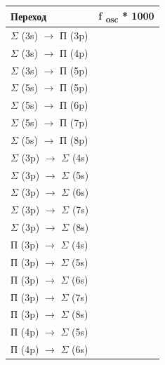 \begin{flushleft}
\tablefirsthead{}
\tablehead{}
\tabletail{}
\tablelasttail{}
\begin{supertabular}{|m{6.577cm}|m{6.801cm}|}
\hline
\textbf{{Переход}} &
\textbf{{f }}\textbf{{\textsubscript{osc }}}\textbf{{* 1000}}\\\hline
{$\Sigma $ (3s) $\rightarrow $ П (3p)} &
\raggedleft{}\\
{$\Sigma $ (3s) $\rightarrow $ П (4p)} &
\raggedleft{}\\
{$\Sigma $ (3s) $\rightarrow $ П (5p)} &
\raggedleft{}\\\hline
{$\Sigma $ (5s) $\rightarrow $ П (5p)} &
\raggedleft{}\\
{$\Sigma $ (5s) $\rightarrow $ П (6p)} &
\raggedleft{}\\
{$\Sigma $ (5s) $\rightarrow $ П (7p)} &
\raggedleft{}\\
{$\Sigma $ (5s) $\rightarrow $ П (8p)} &
\raggedleft{}\\\hline
{$\Sigma $ (3p) $\rightarrow $ $\Sigma $ (4s)} &
\raggedleft{}\\
{$\Sigma $ (3p) $\rightarrow $ $\Sigma $ (5s)} &
\raggedleft{}\\
{$\Sigma $ (3p) $\rightarrow $ $\Sigma $ (6s)} &
\raggedleft{}\\
{$\Sigma $ (3p) $\rightarrow $ $\Sigma $ (7s)} &
\raggedleft{}\\
{$\Sigma $ (3p) $\rightarrow $ $\Sigma $ (8s)} &
\raggedleft{}\\\hline
{П (3p) $\rightarrow $ $\Sigma $ (4s)} &
\raggedleft{}\\
{П (3p) $\rightarrow $ $\Sigma $ (5s)} &
\raggedleft{}\\
{П (3p) $\rightarrow $ $\Sigma $ (6s)} &
\raggedleft{}\\
{П (3p) $\rightarrow $ $\Sigma $ (7s)} &
\raggedleft{}\\
{П (3p) $\rightarrow $ $\Sigma $ (8s)} &
\raggedleft{}\\\hline
{П (4p) $\rightarrow $ $\Sigma $ (5s)} &
\raggedleft{}\\
{П (4p) $\rightarrow $ $\Sigma $ (6s)} &
\raggedleft{}\\

\end{supertabular}
\end{flushleft}
